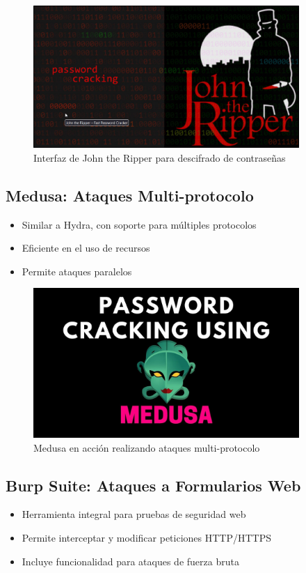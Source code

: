 \documentclass[12pt,a4paper]{article}
\begin{document}
\begin{figure}[H]
    \centering
    \includegraphics[width=0.9\textwidth]{john.png}
    \caption{Interfaz de John the Ripper para descifrado de contraseñas}
    \label{fig:john}
\end{figure}

\subsection{Medusa: Ataques Multi-protocolo}
\begin{itemize}
    \item Similar a Hydra, con soporte para múltiples protocolos
    \item Eficiente en el uso de recursos
    \item Permite ataques paralelos
\end{itemize}

\begin{figure}[H]
    \centering
    \includegraphics[width=0.9\textwidth]{medusa.png}
    \caption{Medusa en acción realizando ataques multi-protocolo}
    \label{fig:medusa}
\end{figure}

\subsection{Burp Suite: Ataques a Formularios Web}
\begin{itemize}
    \item Herramienta integral para pruebas de seguridad web
    \item Permite interceptar y modificar peticiones HTTP/HTTPS
    \item Incluye funcionalidad para ataques de fuerza bruta
\end{itemize}
\end{document}
